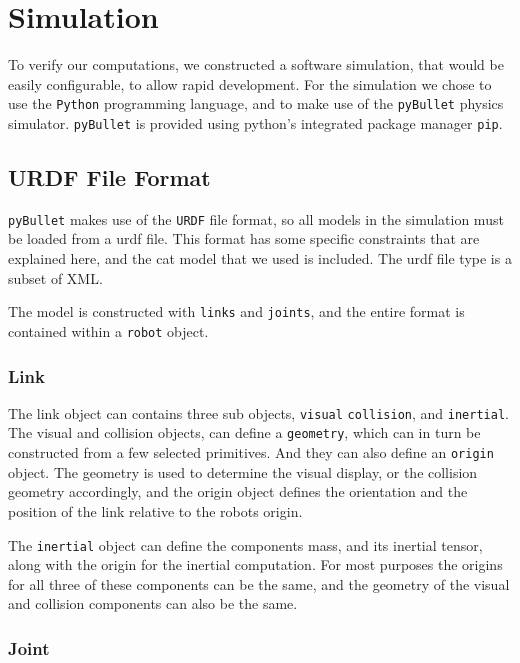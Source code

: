 \documentclass[12]{amsart}
\theoremstyle{definition}
\begin{document}
\section{Simulation}%
\label{sec:simulation}

To verify our computations, we constructed a software simulation, that would be
easily configurable, to allow rapid development. For the simulation we chose to
use the \texttt{Python} programming language, and to make use of the
\texttt{pyBullet} physics simulator. \texttt{pyBullet} is provided using
python's integrated package manager \texttt{pip}.

\subsection{URDF File Format}%
\label{sub:urdf_file_format}

\texttt{pyBullet} makes use of the \texttt{URDF} file format, so all models in
the simulation must be loaded from a urdf file. This format has some specific
constraints that are explained here, and the cat model that we used is
included. The urdf file type is a subset of XML.

The model is constructed with \texttt{links} and \texttt{joints}, and the
entire format is contained within a \texttt{robot} object.

\subsubsection{Link}%
\label{ssub:Link}

The link object can contains three sub objects, \texttt{visual}
\texttt{collision}, and \texttt{inertial}. The visual and collision objects,
can define a \texttt{geometry}, which can in turn be constructed from a few
selected primitives. And they can also define an \texttt{origin} object. The
geometry is used to determine the visual display, or the collision geometry
accordingly, and the origin object defines the orientation and the position of
the link relative to the robots origin.

The \texttt{inertial} object can define the components mass, and its inertial
tensor, along with the origin for the inertial computation. For most purposes
the origins for all three of these components can be the same, and the geometry
of the visual and collision components can also be the same.

\subsubsection{Joint}%
\label{ssub:joint}
\end{document}
